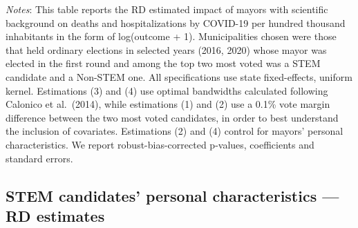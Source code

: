 \documentclass[
  letterpaper,
  DIV=11,
  numbers=noendperiod]{scrartcl}
\begin{document}
\emph{Notes}: This table reports the RD estimated impact of mayors with
scientific background on deaths and hospitalizations by COVID-19 per
hundred thousand inhabitants in the form of log(outcome + 1).
Municipalities chosen were those that held ordinary elections in
selected years (2016, 2020) whose mayor was elected in the first round
and among the top two most voted was a STEM candidate and a Non-STEM
one. All specifications use state fixed-effects, uniform kernel.
Estimations (3) and (4) use optimal bandwidths calculated following
Calonico et al.~(2014), while estimations (1) and (2) use a 0.1\% vote
margin difference between the two most voted candidates, in order to
best understand the inclusion of covariates. Estimations (2) and (4)
control for mayors' personal characteristics. We report
robust-bias-corrected p-values, coefficients and standard errors.

\subsection{STEM candidates' personal characteristics --- RD
estimates}\label{stem-candidates-personal-characteristics-rd-estimates}
\end{document}
